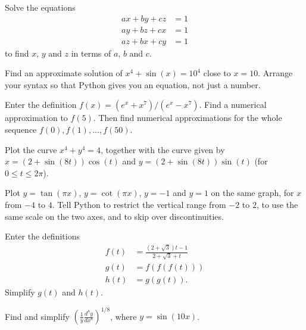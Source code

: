 \documentclass[a4paper,10pt]{amsbook}
\begin{document}
\begin{exercise}
 Solve the equations
 \begin{align*}
  ax+by+cz &= 1 \\
  ay+bz+cx &= 1 \\
  az+bx+cy &= 1
 \end{align*}
 to find $x$, $y$ and $z$ in terms of $a$, $b$ and $c$.
\end{exercise}

\begin{exercise}
 Find an approximate solution of $x^4+\sin(x)=10^4$ close
 to $x=10$.  Arrange your syntax so that Python gives you an
 equation, not just a number.
\end{exercise}

\begin{exercise}
 Enter the definition $f(x)=(e^x+x^7)/(e^x-x^7)$.  Find
 a numerical approximation to $f(5)$.  Then find numerical
 approximations for the whole sequence
 $f(0),f(1),\dotsc,f(50)$. 
\end{exercise}

\begin{exercise}
 Plot the curve $x^4+y^4=4$, together with the curve given
 by $x=(2+\sin(8t))\cos(t)$ and $y=(2+\sin(8t))\sin(t)$ (for
 $0\leq t\leq 2\pi$).
\end{exercise}

\begin{exercise}
 Plot $y=\tan(\pi x)$, $y=\cot(\pi x)$, $y=-1$ and $y=1$ on
 the same graph, for $x$ from $-4$ to $4$.  Tell Python to
 restrict the vertical range from $-2$ to $2$, to use the
 same scale on the two axes, and to skip over
 discontinuities.
\end{exercise}

\begin{exercise}
 Enter the definitions
 \begin{align*}
  f(t) &= \frac{(2+\sqrt{3})t-1}{2+\sqrt{3}+t} \\
  g(t) &= f(f(f(t))) \\
  h(t) &= g(g(t)).
 \end{align*}
 Simplify $g(t)$ and $h(t)$.
\end{exercise}

\begin{exercise}
 Find and simplify $\displaystyle
 \left(\frac{1}{y}\frac{d^8y}{dx^8}\right)^{1/8}$, where
 $y=\sin(10x)$. 
\end{exercise}

\end{document}
